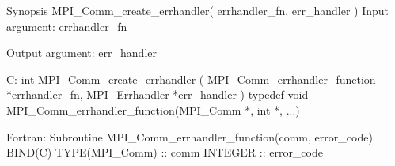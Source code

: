 Synopsis
MPI_Comm_create_errhandler( errhandler_fn, err_handler )
Input argument:
errhandler_fn

Output argument:
err_handler

C:
int MPI_Comm_create_errhandler
   ( MPI_Comm_errhandler_function *errhandler_fn,
     MPI_Errhandler *err_handler )
typedef void MPI_Comm_errhandler_function(MPI_Comm *, int *, ...)

Fortran:
Subroutine MPI_Comm_errhandler_function(comm, error_code) BIND(C)
TYPE(MPI_Comm) ::  comm
INTEGER ::  error_code
